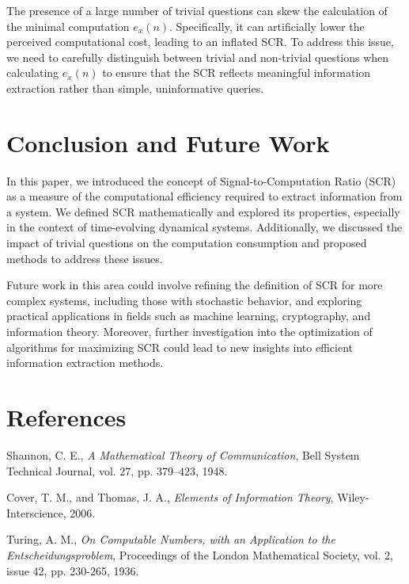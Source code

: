 \documentclass[11pt,a4paper]{article}
\theoremstyle{definition}
\theoremstyle{remark}
\numberwithin{equation}{section}
\begin{document}
The presence of a large number of trivial questions can skew the calculation of the minimal computation \(e_x(n)\). Specifically, it can artificially lower the perceived computational cost, leading to an inflated SCR. To address this issue, we need to carefully distinguish between trivial and non-trivial questions when calculating \(e_x(n)\) to ensure that the SCR reflects meaningful information extraction rather than simple, uninformative queries.

\section{Conclusion and Future Work}
In this paper, we introduced the concept of Signal-to-Computation Ratio (SCR) as a measure of the computational efficiency required to extract information from a system. We defined SCR mathematically and explored its properties, especially in the context of time-evolving dynamical systems. Additionally, we discussed the impact of trivial questions on the computation consumption and proposed methods to address these issues.

Future work in this area could involve refining the definition of SCR for more complex systems, including those with stochastic behavior, and exploring practical applications in fields such as machine learning, cryptography, and information theory. Moreover, further investigation into the optimization of algorithms for maximizing SCR could lead to new insights into efficient information extraction methods.

\section{References}
\begin{thebibliography}{99}
    Shannon, C. E., \textit{A Mathematical Theory of Communication}, Bell System Technical Journal, vol. 27, pp. 379–423, 1948.
    
    Cover, T. M., and Thomas, J. A., \textit{Elements of Information Theory}, Wiley-Interscience, 2006.
    
    Turing, A. M., \textit{On Computable Numbers, with an Application to the Entscheidungsproblem}, Proceedings of the London Mathematical Society, vol. 2, issue 42, pp. 230-265, 1936.
\end{thebibliography}
\end{document}
